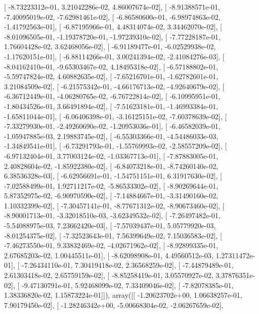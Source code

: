 \documentclass{article}
\begin{document}
       [ -8.73223312e-01,   3.21042286e-02,   4.86007674e-02],
       [ -8.91388571e-01,  -7.40095019e-02,  -7.62981461e-02],
       [ -6.86580600e-01,  -6.98974863e-02,  -1.41792563e-01],
       [ -6.87195966e-01,   4.48314074e-02,   3.34462070e-02],
       [ -8.01096505e-01,  -1.19378720e-01,  -1.97239310e-02],
       [ -7.77228187e-01,   1.76604428e-02,   3.62468056e-02],
       [ -6.91189477e-01,  -6.02529938e-02,  -1.17620151e-01],
       [ -6.88114266e-01,   3.00241394e-02,  -2.41084276e-03],
       [ -8.04162410e-01,  -9.65303467e-02,   4.18495318e-02],
       [ -6.57188802e-01,  -5.59747824e-02,   4.60882635e-02],
       [ -7.65216701e-01,  -1.62782601e-01,   3.21084509e-02],
       [ -6.21575342e-01,  -4.66176713e-02,  -4.92640679e-02],
       [ -6.36712449e-01,  -4.06280765e-02,  -6.76722814e-02],
       [ -6.10995951e-01,  -1.80434526e-01,   3.66491894e-02],
       [ -7.51623181e-01,  -1.46993384e-01,  -1.65811044e-01],
       [ -6.06406398e-01,  -3.16125151e-02,  -7.60378639e-02],
       [ -7.33279930e-01,  -2.49260690e-02,  -1.20953036e-01],
       [ -6.46582039e-01,  -1.05947885e-03,   2.19883745e-02],
       [ -6.55303366e-01,  -4.54486033e-03,  -1.34849541e-01],
       [ -6.73291793e-01,  -1.55769993e-02,  -2.58557209e-02],
       [ -6.97132404e-01,   3.77003124e-02,  -1.03367713e-01],
       [ -7.87883005e-01,   2.40828604e-02,  -1.85922380e-02],
       [ -6.84073218e-01,  -8.74260140e-02,   6.38536328e-03],
       [ -6.62956691e-01,  -1.54751151e-01,   6.31917630e-02],
       [ -7.02588499e-01,   1.92711217e-02,  -5.86533302e-02],
       [ -8.90269644e-01,   5.87352975e-02,  -6.90970590e-02],
       [ -7.14884667e-01,  -3.31490160e-02,   1.10332399e-02],
       [ -7.30457141e-01,  -8.77671312e-02,  -8.90673460e-02],
       [ -8.90001713e-01,  -3.32018510e-03,  -3.62349532e-02],
       [ -7.26497482e-01,  -5.54088975e-03,   7.23662420e-03],
       [ -7.57039437e-01,   5.05779920e-03,  -8.01254375e-02],
       [ -7.32523643e-01,   7.56399649e-02,   7.15036583e-02],
       [ -7.46273550e-01,   9.33832469e-02,  -4.02671962e-02],
       [ -8.92899335e-01,   2.67685203e-02,   1.00445511e-01],
       [ -8.62098908e-01,   4.49560512e-03,   1.27311472e-01],
       [ -7.26434110e-01,   7.30419418e-02,   2.36568259e-02],
       [ -7.44879489e-01,   2.61303418e-02,   2.65759159e-02],
       [ -8.85258419e-01,   3.05570927e-02,   3.37876351e-02],
       [ -9.47130791e-01,   5.92468099e-02,   7.33409046e-02],
       [ -7.82078385e-01,   1.38336820e-02,   1.15873224e-01]]), array([[ -1.20623702e+00,   1.06638257e-01,   7.90179450e-02],
       [ -1.28246342e+00,  -5.00668304e-02,  -2.06267659e-02],
\end{document}
